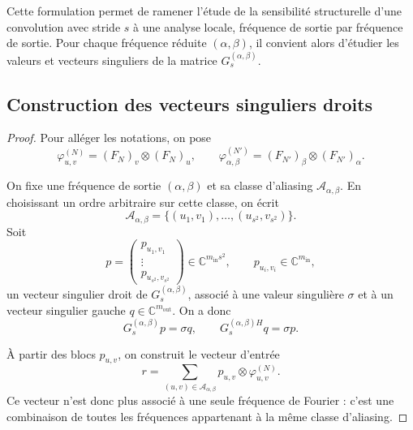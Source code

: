 Cette formulation permet de ramener l'étude de la sensibilité structurelle d'une convolution avec stride $s$ à 
une analyse locale, fréquence de sortie par fréquence de sortie. Pour chaque fréquence réduite $(\alpha,\beta)$, 
il convient alors d'étudier les valeurs et vecteurs singuliers de la matrice $G_s^{(\alpha,\beta)}$.

\subsection{Construction des vecteurs singuliers droits}

\begin{proof}

Pour alléger les notations, on pose
\[
    \varphi_{u,v}^{(N)}
    =
    (F_N)_v \otimes (F_N)_u,
    \qquad
    \varphi_{\alpha,\beta}^{(N')}
    =
    (F_{N'})_\beta \otimes (F_{N'})_\alpha.
\]

On fixe une fréquence de sortie $(\alpha,\beta)$ et sa classe d'aliasing
$\mathcal{A}_{\alpha,\beta}$. En choisissant un ordre arbitraire sur cette classe,
on écrit
\[
    \mathcal{A}_{\alpha,\beta}
    =
    \{(u_1,v_1),\dots,(u_{s^2},v_{s^2})\}.
\]
Soit
\[
    p
    =
    \begin{pmatrix}
        p_{u_1,v_1} \\
        \vdots \\
        p_{u_{s^2},v_{s^2}}
    \end{pmatrix}
    \in \mathbb{C}^{m_{\mathrm{in}}s^2},
    \qquad
    p_{u_i,v_i}\in\mathbb{C}^{m_{\mathrm{in}}},
\]
un vecteur singulier droit de $G_s^{(\alpha,\beta)}$, associé à une valeur singulière
$\sigma$ et à un vecteur singulier gauche $q\in\mathbb{C}^{m_{\mathrm{out}}}$. On a donc
\begin{equation}
    G_s^{(\alpha,\beta)}p
    =
    \sigma q,
    \qquad
    G_s^{(\alpha,\beta)H}q
    =
    \sigma p.
    \label{eq:svd_matrice_aliasing_stride}
\end{equation}

À partir des blocs $p_{u,v}$, on construit le vecteur d'entrée
\begin{equation}
    r
    =
    \sum_{(u,v)\in\mathcal{A}_{\alpha,\beta}}
    p_{u,v}\otimes \varphi_{u,v}^{(N)}.
    \label{eq:construction_vecteur_singulier_stride}
\end{equation}
Ce vecteur n'est donc plus associé à une seule fréquence de Fourier : c'est une combinaison
de toutes les fréquences appartenant à la même classe d'aliasing.


\end{proof}
